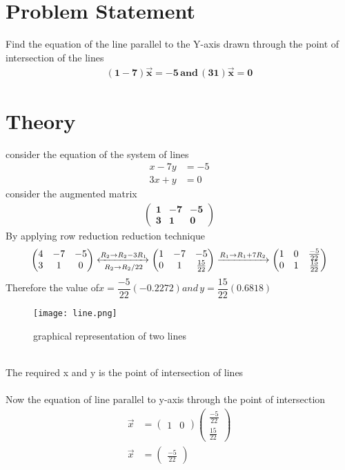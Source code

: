 \documentclass{article}
\newcommand{\myvec}[1]{\ensuremath{\begin{pmatrix}#1\end{pmatrix}}}
\begin{document}
\section{Problem Statement}
Find the equation of the line parallel to the Y-axis drawn through the point of intersection of the lines
\begin{align}
\mathbf{{(1 -7)\vec{x}=-5 \, and \, (3 1)\vec{x}=0}}
\end{align}
\section{Theory}
consider the equation of the system of lines
\begin{align}
x - 7y & = -5 \\
3x + y & = 0
\end{align}
 consider the augmented matrix
 \begin{align}
 \boldsymbol{{\myvec{1 & -7 & -5 \\ 3 & 1 & 0}}}
 \end{align}
 By applying row reduction reduction technique \\
 \begin{align}
\myvec{4 & -7 & -5\\ 3 & 1 & 0}
	\xleftrightarrow[R_2 \rightarrow R_2/22]{R_2 \rightarrow R_2-3R_1}
	\myvec{1 & -7 & -5 \\ 0 & 1 & \frac{15}{22}}
	\xrightarrow[]{R_1 \rightarrow R_1+7R_2}
	 \myvec{1 & 0 & \frac{-5}{22} \\ 0 & 1 & \frac{15}{22}}
 \end{align}
Therefore the value of$ x = \dfrac{-5}{22}(-0.2272) and \, y = \dfrac{15}{22}(0.6818)$ \\
 \begin{figure}
 \texttt{[image: line.png]}
 \caption{graphical representation of two lines}
 \end{figure}
 \\
The required x and y is the point of intersection of lines\\ 
\\
Now the equation of line parallel to y-axis through the point of intersection\\
 \begin{align}
\vec{x} & = \myvec{1 & 0  }\myvec{ \frac{-5}{22}\\ \frac{15}{22}}\\
\vec{x} & = \myvec{\frac{-5}{22}}
 \end{align}
  
\end{document}
